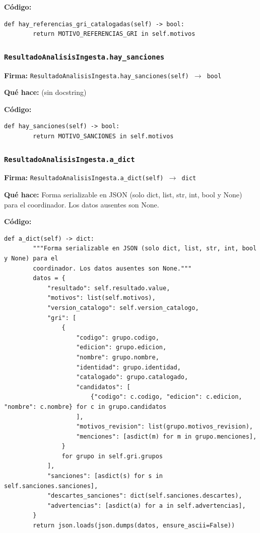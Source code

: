 \documentclass[11pt,a4paper]{article}
\begin{document}
\textbf{Código:}
\begin{lstlisting}
def hay_referencias_gri_catalogadas(self) -> bool:
        return MOTIVO_REFERENCIAS_GRI in self.motivos
\end{lstlisting}

\subsubsection*{\texttt{ResultadoAnalisisIngesta.hay\_sanciones}}
\textbf{Firma:} \texttt{ResultadoAnalisisIngesta.hay\_sanciones(self) $\rightarrow$ bool}

\textbf{Qué hace:} (sin docstring)

\textbf{Código:}
\begin{lstlisting}
def hay_sanciones(self) -> bool:
        return MOTIVO_SANCIONES in self.motivos
\end{lstlisting}

\subsubsection*{\texttt{ResultadoAnalisisIngesta.a\_dict}}
\textbf{Firma:} \texttt{ResultadoAnalisisIngesta.a\_dict(self) $\rightarrow$ dict}

\textbf{Qué hace:} Forma serializable en JSON (solo dict, list, str, int, bool y None) para el
coordinador. Los datos ausentes son None.

\textbf{Código:}
\begin{lstlisting}
def a_dict(self) -> dict:
        """Forma serializable en JSON (solo dict, list, str, int, bool y None) para el
        coordinador. Los datos ausentes son None."""
        datos = {
            "resultado": self.resultado.value,
            "motivos": list(self.motivos),
            "version_catalogo": self.version_catalogo,
            "gri": [
                {
                    "codigo": grupo.codigo,
                    "edicion": grupo.edicion,
                    "nombre": grupo.nombre,
                    "identidad": grupo.identidad,
                    "catalogado": grupo.catalogado,
                    "candidatos": [
                        {"codigo": c.codigo, "edicion": c.edicion, "nombre": c.nombre} for c in grupo.candidatos
                    ],
                    "motivos_revision": list(grupo.motivos_revision),
                    "menciones": [asdict(m) for m in grupo.menciones],
                }
                for grupo in self.gri.grupos
            ],
            "sanciones": [asdict(s) for s in self.sanciones.sanciones],
            "descartes_sanciones": dict(self.sanciones.descartes),
            "advertencias": [asdict(a) for a in self.advertencias],
        }
        return json.loads(json.dumps(datos, ensure_ascii=False))
\end{lstlisting}
\end{document}
